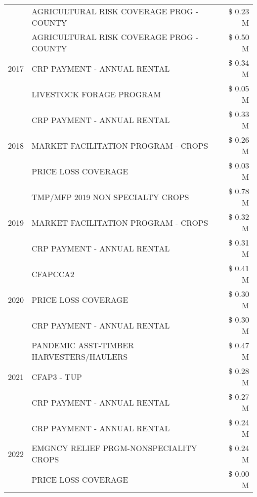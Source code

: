 \begin{tabular}{llr}
 & AGRICULTURAL RISK COVERAGE PROG - COUNTY & \$ 0.23 M \\
\cline{1-3}
\multirow[t]{3}{*}{2017} & AGRICULTURAL RISK COVERAGE PROG - COUNTY & \$ 0.50 M \\
 & CRP PAYMENT - ANNUAL RENTAL & \$ 0.34 M \\
 & LIVESTOCK FORAGE PROGRAM & \$ 0.05 M \\
\cline{1-3}
\multirow[t]{3}{*}{2018} & CRP PAYMENT - ANNUAL RENTAL & \$ 0.33 M \\
 & MARKET FACILITATION PROGRAM - CROPS & \$ 0.26 M \\
 & PRICE LOSS COVERAGE & \$ 0.03 M \\
\cline{1-3}
\multirow[t]{3}{*}{2019} & TMP/MFP 2019 NON SPECIALTY CROPS & \$ 0.78 M \\
 & MARKET FACILITATION PROGRAM - CROPS & \$ 0.32 M \\
 & CRP PAYMENT - ANNUAL RENTAL & \$ 0.31 M \\
\cline{1-3}
\multirow[t]{3}{*}{2020} & CFAPCCA2 & \$ 0.41 M \\
 & PRICE LOSS COVERAGE & \$ 0.30 M \\
 & CRP PAYMENT - ANNUAL RENTAL & \$ 0.30 M \\
\cline{1-3}
\multirow[t]{3}{*}{2021} & PANDEMIC ASST-TIMBER HARVESTERS/HAULERS & \$ 0.47 M \\
 & CFAP3 - TUP & \$ 0.28 M \\
 & CRP PAYMENT - ANNUAL RENTAL & \$ 0.27 M \\
\cline{1-3}
\multirow[t]{3}{*}{2022} & CRP PAYMENT - ANNUAL RENTAL & \$ 0.24 M \\
 & EMGNCY RELIEF PRGM-NONSPECIALITY CROPS & \$ 0.24 M \\
 & PRICE LOSS COVERAGE & \$ 0.00 M \\
\cline{1-3}
\bottomrule
\end{tabular}
